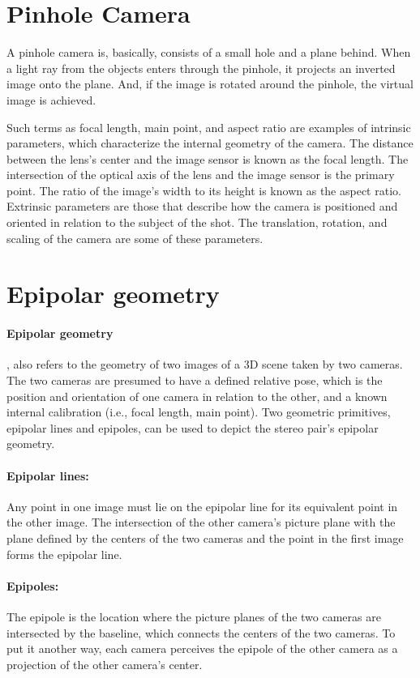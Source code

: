 \documentclass[11pt]{article}
\begin{document}
    \section{Pinhole Camera}
        A pinhole camera is, basically, consists of a small hole and a plane behind. When a light ray from
    the objects enters through the pinhole, it projects an inverted image onto the plane. And, if the
    image is rotated around the pinhole, the virtual image is achieved.

    Such terms as focal length, main point, and aspect ratio are examples of intrinsic parameters,
    which characterize the internal geometry of the camera. The distance between the lens's
    center and the image sensor is known as the focal length. The intersection of the optical axis
    of the lens and the image sensor is the primary point. The ratio of the image's width to its
    height is known as the aspect ratio.
    Extrinsic parameters are those that describe how the camera is positioned and oriented in
    relation to the subject of the shot. The translation, rotation, and scaling of the camera are
    some of these parameters.

    \section{Epipolar geometry}

    \paragraph{Epipolar geometry}, also refers to the geometry of two images of a 3D scene taken
    by two cameras. The two cameras are presumed to have a defined relative pose, which is
    the position and orientation of one camera in relation to the other, and a known internal calibration
    (i.e., focal length, main point). Two geometric primitives, epipolar lines and epipoles, can be used
    to depict the stereo pair's epipolar geometry.
    \paragraph{Epipolar lines:} Any point in one image must lie on the epipolar line for its equivalent
    point in the other image. The intersection of the other camera's picture plane with the plane defined
    by the centers of the two cameras and the point in the first image forms the epipolar line.

    \paragraph{Epipoles:} The epipole is the location where the picture planes of the two cameras are
    intersected by the baseline, which connects the centers of the two cameras. To put it another way,
    each camera perceives the epipole of the other camera as a projection of the other camera's center.
    
\end{document}
